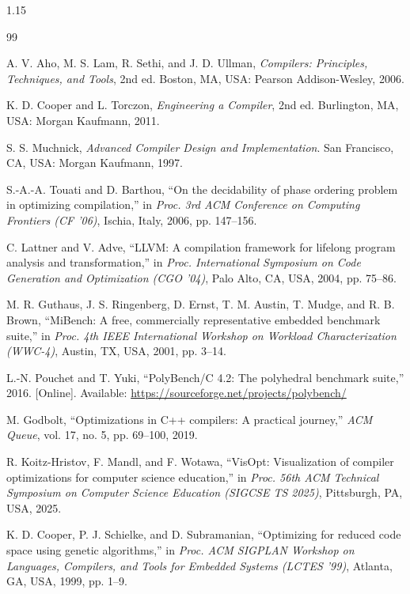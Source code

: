 {}
\begin{spacing}{1.15}
\begin{thebibliography}{99}
\setlength{\itemsep}{4pt}

 A. V. Aho, M. S. Lam, R. Sethi, and J. D. Ullman, \emph{Compilers: Principles, Techniques, and Tools}, 2nd ed. Boston, MA, USA: Pearson Addison-Wesley, 2006.

 K. D. Cooper and L. Torczon, \emph{Engineering a Compiler}, 2nd ed. Burlington, MA, USA: Morgan Kaufmann, 2011.

 S. S. Muchnick, \emph{Advanced Compiler Design and Implementation}. San Francisco, CA, USA: Morgan Kaufmann, 1997.

 S.-A.-A. Touati and D. Barthou, ``On the decidability of phase ordering problem in optimizing compilation,'' in \emph{Proc. 3rd ACM Conference on Computing Frontiers (CF '06)}, Ischia, Italy, 2006, pp. 147--156.

 C. Lattner and V. Adve, ``LLVM: A compilation framework for lifelong program analysis and transformation,'' in \emph{Proc. International Symposium on Code Generation and Optimization (CGO '04)}, Palo Alto, CA, USA, 2004, pp. 75--86.

 M. R. Guthaus, J. S. Ringenberg, D. Ernst, T. M. Austin, T. Mudge, and R. B. Brown, ``MiBench: A free, commercially representative embedded benchmark suite,'' in \emph{Proc. 4th IEEE International Workshop on Workload Characterization (WWC-4)}, Austin, TX, USA, 2001, pp. 3--14.

 L.-N. Pouchet and T. Yuki, ``PolyBench/C 4.2: The polyhedral benchmark suite,'' 2016. [Online]. Available: \url{https://sourceforge.net/projects/polybench/}

 M. Godbolt, ``Optimizations in C++ compilers: A practical journey,'' \emph{ACM Queue}, vol. 17, no. 5, pp. 69--100, 2019.

 R. Koitz-Hristov, F. Mandl, and F. Wotawa, ``VisOpt: Visualization of compiler optimizations for computer science education,'' in \emph{Proc. 56th ACM Technical Symposium on Computer Science Education (SIGCSE TS 2025)}, Pittsburgh, PA, USA, 2025.

 K. D. Cooper, P. J. Schielke, and D. Subramanian, ``Optimizing for reduced code space using genetic algorithms,'' in \emph{Proc. ACM SIGPLAN Workshop on Languages, Compilers, and Tools for Embedded Systems (LCTES '99)}, Atlanta, GA, USA, 1999, pp. 1--9.


\end{thebibliography}
\end{spacing}
